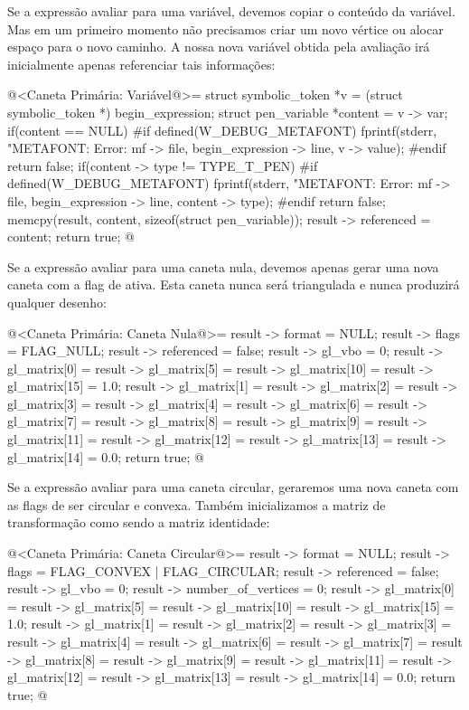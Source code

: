 {Se a expressão avaliar para uma variável, devemos copiar o conteúdo da
variável. Mas em um primeiro momento não precisamos criar um novo
vértice ou alocar espaço para o novo caminho. A nossa nova variável
obtida pela avaliação irá inicialmente apenas referenciar tais
informações:

\iniciocodigo
@<Caneta Primária: Variável@>=
struct symbolic_token *v = (struct symbolic_token *) begin_expression;
struct pen_variable *content = v -> var;
if(content == NULL){
#if defined(W_DEBUG_METAFONT)
  fprintf(stderr, "METAFONT: Error: %
          mf -> file, begin_expression -> line, v -> value);
#endif
  return false;
}
if(content -> type != TYPE_T_PEN){
#if defined(W_DEBUG_METAFONT)
  fprintf(stderr, "METAFONT: Error: %
          mf -> file, begin_expression -> line, content -> type);
#endif
  return false;
}
memcpy(result, content, sizeof(struct pen_variable));
result -> referenced = content;
return true;
@
\fimcodigo

Se a expressão avaliar para uma caneta nula, devemos apenas gerar uma
nova caneta com a flag de  ativa. Esta caneta
nunca será triangulada e nunca produzirá qualquer desenho:

\iniciocodigo
@<Caneta Primária: Caneta Nula@>=
result -> format = NULL;
result -> flags = FLAG_NULL;
result -> referenced = false;
result -> gl_vbo = 0;
result -> gl_matrix[0] = result -> gl_matrix[5] = result -> gl_matrix[10] =
                         result -> gl_matrix[15] = 1.0; 
result -> gl_matrix[1] = result -> gl_matrix[2] = result -> gl_matrix[3] = 
                         result -> gl_matrix[4] = result -> gl_matrix[6] =
                         result -> gl_matrix[7] = result -> gl_matrix[8] = 
                         result -> gl_matrix[9] = result -> gl_matrix[11] =
                         result -> gl_matrix[12] = result -> gl_matrix[13] =
                         result -> gl_matrix[14] = 0.0;
return true;
@
\fimcodigo

Se a expressão avaliar para uma caneta circular, geraremos uma nova
caneta com as flags de ser circular e convexa. Também inicializamos a
matriz de transformação como sendo a matriz identidade:

\iniciocodigo
@<Caneta Primária: Caneta Circular@>=
result -> format = NULL;
result -> flags = FLAG_CONVEX | FLAG_CIRCULAR;
result -> referenced = false;
result -> gl_vbo = 0;
result -> number_of_vertices = 0;
result -> gl_matrix[0] = result -> gl_matrix[5] = result -> gl_matrix[10] =
                         result -> gl_matrix[15] = 1.0; 
result -> gl_matrix[1] = result -> gl_matrix[2] = result -> gl_matrix[3] = 
                         result -> gl_matrix[4] = result -> gl_matrix[6] =
                         result -> gl_matrix[7] = result -> gl_matrix[8] = 
                         result -> gl_matrix[9] = result -> gl_matrix[11] =
                         result -> gl_matrix[12] = result -> gl_matrix[13] =
                         result -> gl_matrix[14] = 0.0;
return true;
@
\fimcodigo

}
